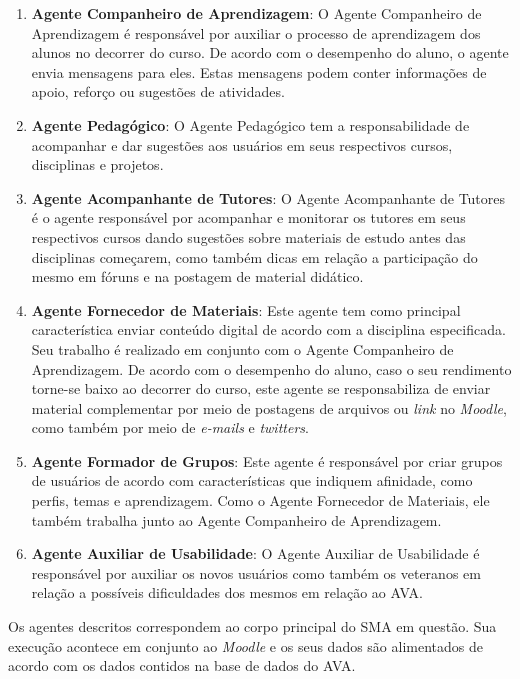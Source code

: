 \begin{enumerate}
\item \textbf{Agente Companheiro de Aprendizagem}: O Agente Companheiro de Aprendizagem é responsável por auxiliar o processo de aprendizagem dos alunos no decorrer do curso. De acordo com o desempenho do aluno, o agente envia mensagens para eles. Estas mensagens podem conter informações de apoio, reforço ou sugestões de atividades.
\item \textbf{Agente Pedagógico}: O Agente Pedagógico tem a responsabilidade de acompanhar e dar sugestões aos usuários em seus respectivos cursos, disciplinas e projetos.
\item \textbf{Agente Acompanhante de Tutores}: O Agente Acompanhante de Tutores é o agente responsável por acompanhar e monitorar os tutores em seus respectivos cursos dando sugestões sobre materiais de estudo antes das disciplinas começarem, como também dicas em relação a participação do mesmo em fóruns e na postagem de material didático.
\item \textbf{Agente Fornecedor de Materiais}: Este agente tem como principal característica enviar conteúdo digital de acordo com a disciplina especificada. Seu trabalho é realizado em conjunto com o Agente Companheiro de Aprendizagem. De acordo com o desempenho do aluno, caso o seu rendimento torne-se baixo ao decorrer do curso, este agente se responsabiliza de enviar material complementar por meio de postagens de arquivos ou \textit{link} no \textit{Moodle}, como também por meio de \textit{e-mails} e \textit{twitters}.
\item \textbf{Agente Formador de Grupos}: Este agente é responsável por criar grupos de usuários de acordo com características que indiquem afinidade, como perfis, temas e aprendizagem. Como o Agente Fornecedor de Materiais, ele também trabalha junto ao Agente Companheiro de Aprendizagem.
\item \textbf{Agente Auxiliar de Usabilidade}: O Agente Auxiliar de Usabilidade é responsável por auxiliar os novos usuários como também os veteranos em relação a possíveis dificuldades dos mesmos em relação ao AVA.
\end{enumerate}

Os agentes descritos correspondem ao corpo principal do SMA em questão. Sua execução acontece em conjunto ao \textit{Moodle} e os seus dados são alimentados de acordo com os dados contidos na base de dados do AVA.

\label{sec:analise}

